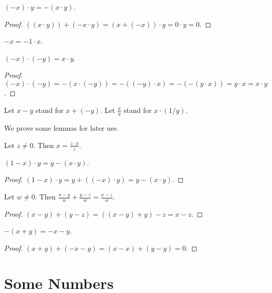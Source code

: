 \documentclass{article}
\begin{document}
\begin{forthel}
\begin{proposition}
$(-x) \cdot y = -(x \cdot y)$.
\end{proposition}
\begin{proof}
$((x \cdot y)) + (-x \cdot y) = (x + (-x)) \cdot y
= 0 \cdot y = 0$.
\end{proof}

\begin{proposition}
$-x = -1 \cdot x$.
\end{proposition}

\begin{proposition}
$(-x) \cdot (-y) = x \cdot y$.
\end{proposition}
\begin{proof}
$(-x)\cdot (-y) = -(x\cdot(-y)) = -((-y)\cdot x) =
-(-(y\cdot x)) = y\cdot x = x\cdot y$.
\end{proof}
\end{forthel}
%
\begin{forthel}
Let $x - y$ stand for $x + (-y)$.
Let $\frac{x}{y}$ stand for $x \cdot (1/y)$.
\end{forthel}
%
We prove some lemmas for later use.
%
\begin{forthel}
\begin{lemma} Let $z \neq 0$. Then
$x = \frac{z \cdot x}{z}$.
\end{lemma}

\begin{lemma}
$(1 - x) \cdot y = y - (x \cdot y)$.
\end{lemma}
\begin{proof}
$(1 - x) \cdot y = y + ((-x) \cdot y) = y - (x \cdot y)$.
\end{proof}

\begin{lemma} Let $w \neq 0$. Then
$\frac{x - y}{w} + \frac{y - z}{w} = \frac{x - z}{w}$.
\end{lemma}
\begin{proof}
$(x - y) + (y - z) = ((x - y) + y) - z = x - z$.
\end{proof}

\begin{lemma}
$-(x + y) = -x - y$.
\end{lemma}
\begin{proof}
$(x + y) + (-x - y) = (x - x) + (y - y) = 0.$
\end{proof}

\end{forthel}

\section{Some Numbers}
\end{document}
